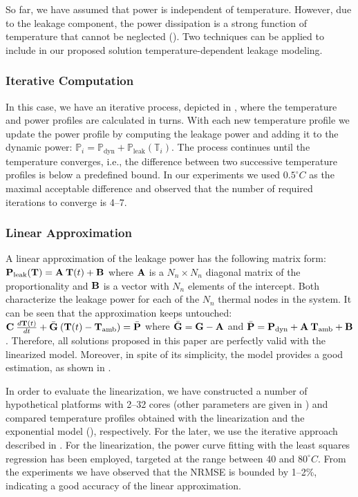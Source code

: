 So far, we have assumed that power is independent of temperature. However, due
to the leakage component, the power dissipation is a strong function of
temperature that cannot be neglected (). Two techniques can be
applied to include in our proposed solution temperature-dependent leakage
modeling.

\subsubsection{Iterative Computation} 

In this case, we have an iterative process, depicted in , where
the temperature and power profiles are calculated in turns. With each new
temperature profile we update the power profile by computing the leakage power
and adding it to the dynamic power: $\mathbb{P}_i = \mathbb{P}_\text{dyn} +
\mathbb{P}_\text{leak}(\mathbb{T}_i)$. The process continues until the
temperature converges, i.e., the difference between two successive temperature
profiles is below a predefined bound. In our experiments we used $0.5^\circ C$
as the maximal acceptable difference and observed that the number of required
iterations to converge is 4--7.

\subsubsection{Linear Approximation} 

A linear approximation of the leakage power has the following matrix form:
$\mathbf{P}_{\mathrm{leak}}(\mathbf{T}) = \mathbf{A} \: \mathbf{T}(t) + \mathbf{B}$ where $\mathbf{A}$ is a $N_n
\times N_n$ diagonal matrix of the proportionality and $\mathbf{B}$ is a vector with
$N_n$ elements of the intercept. Both characterize the leakage power for each of
the $N_n$ thermal nodes in the system. It can be seen that the approximation
keeps  untouched: $\mathbf{C} \: \frac{d\mathbf{T}(t)}{dt} +
\bar{\mathbf{G}} \: (\mathbf{T}(t) - \mathbf{T}_{\mathrm{amb}}) = \bar{\mathbf{P}}$ where $\bar{\mathbf{G}} =
\mathbf{G} - \mathbf{A}$ and $\bar{\mathbf{P}} = \mathbf{P}_{\mathrm{dyn}} + \mathbf{A} \: \mathbf{T}_{\mathrm{amb}} +
\mathbf{B}$. Therefore, all solutions proposed in this paper are perfectly valid with
the linearized model. Moreover, in spite of its simplicity, the model provides a
good estimation, as shown in \cite{liu2007}.

In order to evaluate the linearization, we have constructed a number of
hypothetical platforms with 2--32 cores (other parameters are given in
) and compared temperature profiles obtained with the
linearization and the exponential model (), respectively. For
the later, we use the iterative approach described in .
For the linearization, the power curve fitting with the least squares regression
\cite{press2007} has been employed, targeted at the range between 40 and
$80^\circ C$. From the experiments we have observed that the NRMSE is bounded by
1--2\%, indicating a good accuracy of the linear approximation.

